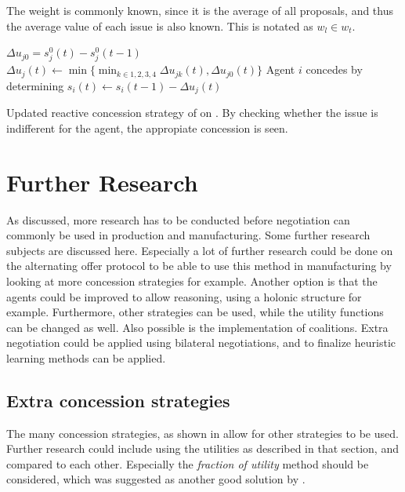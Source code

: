 The weight is commonly known, since it is the average of all proposals, and thus the average value of each issue is also known. This is notated as $w_l \in w_t$.  
 
\begin{algorithm}[h]
$\Delta u_{j0} = s^0_j(t)-s^0_j(t-1)$\;
{
	$\Delta u_j(t)\leftarrow \min \{\displaystyle \min_{k\in 1, 2, 3, 4}\Delta u_{jk}(t), \Delta u_{j0}(t)\}$ \;	
}
Agent $i$ concedes by determining $s_i(t)\leftarrow s_i(t-1)-\Delta u_j(t)$\;
\caption{Updated reactive concession strategy of  on . By checking whether the issue is indifferent for the agent, the appropiate concession is seen.}
\label{al:algorithm2}
\end{algorithm}
\clearpage
\section{Further Research}
As discussed, more research has to be conducted before negotiation can commonly be used in production and manufacturing. Some further research subjects are discussed here. Especially a lot of further research could be done on the alternating offer protocol to be able to use this method in manufacturing by looking at more concession strategies for example. Another option is that the agents could be improved to allow reasoning, using a holonic structure for example. Furthermore, other strategies can be used, while the utility functions can be changed as well. Also possible is the implementation of coalitions. Extra negotiation could be applied using bilateral negotiations, and to finalize heuristic learning methods can be applied.

\subsection{Extra concession strategies}
The many concession strategies, as shown in  allow for other strategies to be used. Further research could include using the utilities as described in that section, and compared to each other. Especially the \textit{fraction of utility} method should be considered, which was suggested as another good solution by \citet{wu2009efficient}. 

